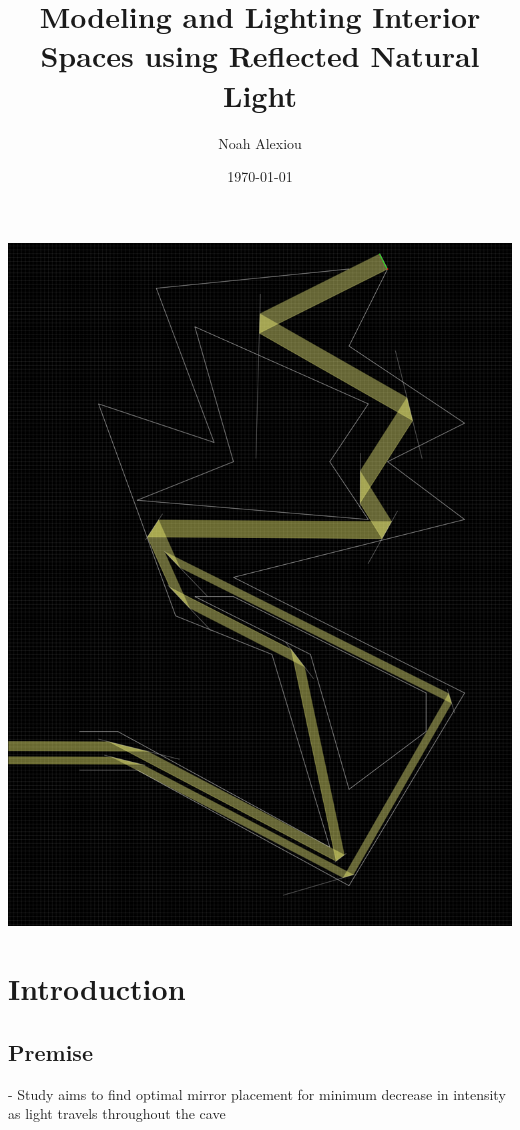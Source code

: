 \documentclass[11pt, letterpaper]{article}
\begin{document}
\begin{titlepage}
	\title{Modeling and Lighting Interior Spaces using Reflected Natural Light}
	\author{Noah Alexiou}
	\date{\today}
	
	\maketitle
	\centering
	\includegraphics[width=15cm]{Images/Cave.png}
	
\end{titlepage}

\newpage
\tableofcontents


\newpage

\section{Introduction}


\subsection{Premise}
- Study aims to find optimal mirror placement for minimum decrease in intensity as light travels throughout the cave 
\end{document}
